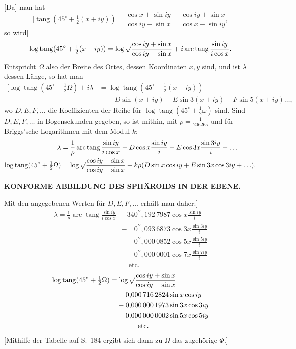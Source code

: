 [Da] man hat
\[
[\operatorname{tang}(45^\circ+\tfrac12(x+iy))=
\frac{\cos x+\sin iy}{\cos iy-\sin x}=
\frac{\cos iy+\sin x}{\cos x-\sin iy},
\]
\noindent so wird]
\[
\log\operatorname{tang}(45^\circ+\tfrac12(x+iy))
=\log\surd\frac{\cos iy+\sin x}{\cos iy-\sin x}
+i\operatorname{arc}\operatorname{tang}\frac{\sin iy}{i\cos x}.
\]
Entspricht \(\Omega\) also der Breite des Ortes, dessen Koordinaten \(x,y\) sind,
und ist \(\lambda\) dessen Länge, so hat man
\[
\begin{aligned}
\mathopen{[}\log\operatorname{tang}(45^\circ+\tfrac12\Omega)+i\lambda
  &=\log\operatorname{tang}(45^\circ+\tfrac12(x+iy))\\
  &\quad-D\sin(x+iy)-E\sin3(x+iy)-F\sin5(x+iy)\ldots,
\end{aligned}
\]
\noindent wo \(D,E,F,\ldots\) die Koeffizienten der Reihe für
\(\log\operatorname{tang}(45^\circ+\tfrac12\omega)\) sind. Sind \(D,E,F,\ldots\)
in Bogensekunden gegeben, so ist mithin, mit \(\rho=\tfrac{1}{206265}\) und für
Briggs'sche Logarithmen mit dem Modul \(k\):
\[
\begin{aligned}
\lambda&=\frac1\rho\operatorname{arc}\operatorname{tang}\frac{\sin iy}{i\cos x}
-D\cos x\frac{\sin iy}{i}-E\cos3x\frac{\sin3iy}{i}-\ldots\\
\log\operatorname{tang}(45^\circ+\tfrac12\Omega)
&=\log\surd\frac{\cos iy+\sin x}{\cos iy-\sin x}
-k\rho(D\sin x\cos iy+E\sin3x\cos3iy+\ldots).
\end{aligned}
\]

\par\clearpage
\noindent\null\hfill{\small\textbf{KONFORME ABBILDUNG DES SPHÄROIDS IN DER EBENE.}}\hfill{}\par\medskip

Mit den angegebenen Werten für \(D,E,F,\ldots\) erhält man daher:]
\[
\begin{aligned}
\lambda=\frac1\rho\operatorname{arc}\operatorname{tang}\frac{\sin iy}{i\cos x}
&-340^{\prime\prime}{,}192\,7987\cos x\frac{\sin iy}{i}\\
&-\phantom{34}0^{\prime\prime}{,}093\,6873\cos3x\frac{\sin3iy}{i}\\
&-\phantom{34}0^{\prime\prime}{,}000\,0852\cos5x\frac{\sin5iy}{i}\\
&-\phantom{34}0^{\prime\prime}{,}000\,0001\cos7x\frac{\sin7iy}{i}\\
&\quad\text{etc.}
\end{aligned}
\]
\[
\begin{aligned}
\log\operatorname{tang}(45^\circ+\tfrac12\Omega)
&=\log\surd\frac{\cos iy+\sin x}{\cos iy-\sin x}\\
&\phantom{={}}-0{,}000\,716\,2824\sin x\cos iy\\
&\phantom{={}}-0{,}000\,000\,1973\sin3x\cos3iy\\
&\phantom{={}}-0{,}000\,000\,0002\sin5x\cos5iy\\
&\qquad\qquad\text{etc.}
\end{aligned}
\]
[Mithilfe der Tabelle auf S.\ 184 ergibt sich dann zu \(\Omega\) das zugehörige \(\Phi\).]

